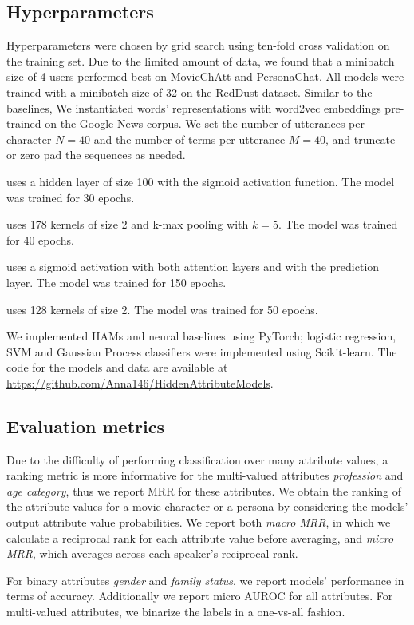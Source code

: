 \subsection{Hyperparameters}
Hyperparameters were chosen by grid search using ten-fold cross validation on the training set.
Due to the limited amount of data, we found that a minibatch size of 4 users performed best on MovieChAtt and PersonaChat.
All models were trained with a minibatch size of 32 on the RedDust dataset.
Similar to the baselines, We instantiated words' representations with word2vec embeddings pre-trained on the Google News corpus.
We set the number of utterances per character $N=40$ and the number of terms per utterance $M=40$, and truncate or zero pad the sequences as needed.

\squishlist
\item \textbf{} uses a hidden layer of size 100 with the sigmoid activation function. The model was trained for 30 epochs.
\item \textbf{} uses 178 kernels of size 2 and k-max pooling with $k=5$. The model was trained for 40 epochs.
\item \textbf{} uses a sigmoid activation with both attention layers and with the prediction layer.
The model was trained for 150 epochs.
\item \textbf{} uses 128 kernels of size 2. The model was trained for 50 epochs.
\squishend

\vspace{20pt}
We implemented HAMs and neural baselines using \gls{PyTorch}; logistic regression, SVM and Gaussian Process classifiers were implemented using \gls{Scikit-learn}. The code for the models and data are available at \href{https://github.com/Anna146/HiddenAttributeModels}{https://github.com/Anna146/HiddenAttributeModels}.

 \subsection{Evaluation metrics}
\label{metric}

Due to the difficulty of performing classification over many attribute values, a ranking metric is more informative for the multi-valued attributes \textit{profession} and \textit{age category}, thus we report MRR for these attributes. We obtain the ranking of the attribute values for a movie character or a persona by considering the models' output attribute value probabilities.
We report both \textit{macro MRR}, in which we calculate a reciprocal rank for each attribute value before averaging, and \textit{micro MRR}, which averages across each speaker's reciprocal rank.

For binary attributes \textit{gender} and \textit{family status}, we report models' performance in terms of accuracy. Additionally we report micro AUROC for all attributes. For multi-valued attributes, we binarize the labels in a one-vs-all fashion.